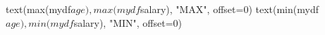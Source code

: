 \begin{Schunk}
\begin{Sinput}
 text(max(mydf$age), max(mydf$salary), "MAX", offset=0)
 text(min(mydf$age), min(mydf$salary), "MIN", offset=0)
\end{Sinput}
\end{Schunk}
